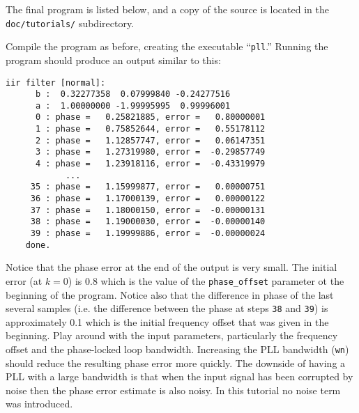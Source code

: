 The final program is listed below,
and a copy of the source is located in the {\tt doc/tutorials/}
subdirectory.
%

%
Compile the program as before, creating the executable ``{\tt pll}.''
Running the program should produce an output similar to this:
\begin{Verbatim}[fontsize=\small]
    iir filter [normal]:
      b :  0.32277358  0.07999840 -0.24277516
      a :  1.00000000 -1.99995995  0.99996001
      0 : phase =   0.25821885, error =   0.80000001
      1 : phase =   0.75852644, error =   0.55178112
      2 : phase =   1.12857747, error =   0.06147351
      3 : phase =   1.27319980, error =  -0.29857749
      4 : phase =   1.23918116, error =  -0.43319979
            ...
     35 : phase =   1.15999877, error =   0.00000751
     36 : phase =   1.17000139, error =   0.00000122
     37 : phase =   1.18000150, error =  -0.00000131
     38 : phase =   1.19000030, error =  -0.00000140
     39 : phase =   1.19999886, error =  -0.00000024
    done.
\end{Verbatim}
%
Notice that the phase error at the end of the output is very small.
The initial error (at $k=0$) is 0.8 which is the value of the
{\tt phase\_offset} parameter ot the beginning of the program.
Notice also that the difference in phase of the last several samples
(i.e. the difference between the phase at steps {\tt 38} and {\tt 39})
is approximately 0.1 which is the initial frequency offset that was
given in the beginning.
Play around with the input parameters, particularly the frequency offset
and the phase-locked loop bandwidth.
Increasing the PLL bandwidth ({\tt wn}) should reduce the resulting
phase error more quickly.
The downside of having a PLL with a large bandwidth is that when the
input signal has been corrupted by noise then the phase error estimate
is also noisy.
In this tutorial no noise term was introduced. %

